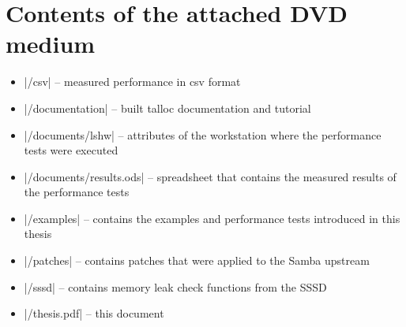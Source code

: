 \chapter{Contents of the attached DVD medium}

\begin{itemize}
  \item |/csv| -- measured performance in csv format
  \item |/documentation| -- built talloc documentation and tutorial
  \item |/documents/lshw| -- attributes of the workstation where the performance
  tests were executed
  \item |/documents/results.ods| -- spreadsheet that contains the measured
  results of the performance tests
  \item |/examples| -- contains the examples and performance tests introduced
  in this thesis
  \item |/patches| -- contains patches that were applied to the Samba upstream
  \item |/sssd| -- contains memory leak check functions from the SSSD
  \item |/thesis.pdf| -- this document
\end{itemize}
